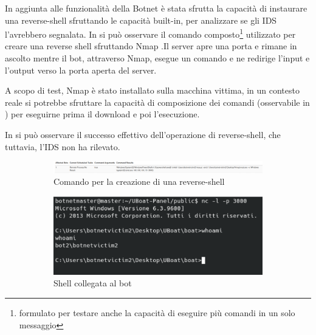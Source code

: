 \medskip
In aggiunta alle funzionalità della Botnet è stata sfrutta la capacità di instaurare una reverse-shell sfruttando le capacità built-in, per analizzare se gli IDS l'avrebbero segnalata.
In  si può osservare il comando composto\footnote{ formulato per testare anche la capacità di eseguire più comandi in un solo messaggio} utilizzato per creare una reverse shell sfruttando Nmap \cite{nmap}.Il server apre una porta e rimane in ascolto mentre il bot, attraverso Nmap,  esegue un comando e ne redirige l'input e l'output verso la porta aperta del server.

A scopo di test, Nmap è stato installato sulla macchina vittima, in un contesto reale si potrebbe sfruttare la capacità di composizione dei comandi (osservabile in ) per eseguirne prima il download e poi l'esecuzione.

In  si può osservare il successo effettivo dell'operazione di reverse-shell, che tuttavia, l'IDS non ha rilevato.

\begin{figure}
    \centering
    \begin{subfigure}{0.4\textwidth}
    \centering
    \includegraphics[width=\textwidth]{res/fig/reverse-shell1.png}
    \caption{Comando per la creazione di una reverse-shell}
    \label{fig:uboat-reverseshell1}
    \end{subfigure}
    \hfill
    \begin{subfigure}{0.4\textwidth}
    \centering
    \includegraphics[width=\textwidth]{res/fig/reverse-shell2.png}
    \caption{Shell collegata al bot}
    \label{fig:uboat-reverseshell2}
    \end{subfigure}
    \caption{}
    \label{fif:uboat-reverseshell}
\end{figure}

